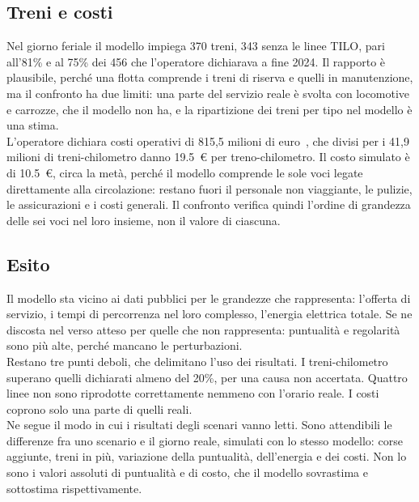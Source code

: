 \subsection{Treni e costi}
Nel giorno feriale il modello impiega 370 treni, 343 senza le linee TILO, pari all'81\% e al 75\% dei 456 che l'operatore dichiarava a fine 2024. Il rapporto è plausibile, perché una flotta comprende i treni di riserva e quelli in manutenzione, ma il confronto ha due limiti: una parte del servizio reale è svolta con locomotive e carrozze, che il modello non ha, e la ripartizione dei treni per tipo nel modello è una stima. \\
L'operatore dichiara costi operativi di 815,5 milioni di euro~\cite{trenord2026bilancio}, che divisi per i 41,9 milioni di treni-chilometro danno \SI{19,5}{\euro} per treno-chilometro. Il costo simulato è di \SI{10,5}{\euro}, circa la metà, perché il modello comprende le sole voci legate direttamente alla circolazione: restano fuori il personale non viaggiante, le pulizie, le assicurazioni e i costi generali. Il confronto verifica quindi l'ordine di grandezza delle sei voci nel loro insieme, non il valore di ciascuna.

\subsection{Esito}
Il modello sta vicino ai dati pubblici per le grandezze che rappresenta: l'offerta di servizio, i tempi di percorrenza nel loro complesso, l'energia elettrica totale. Se ne discosta nel verso atteso per quelle che non rappresenta: puntualità e regolarità sono più alte, perché mancano le perturbazioni. \\
Restano tre punti deboli, che delimitano l'uso dei risultati. I treni-chilometro superano quelli dichiarati almeno del 20\%, per una causa non accertata. Quattro linee non sono riprodotte correttamente nemmeno con l'orario reale. I costi coprono solo una parte di quelli reali. \\
Ne segue il modo in cui i risultati degli scenari vanno letti. Sono attendibili le differenze fra uno scenario e il giorno reale, simulati con lo stesso modello: corse aggiunte, treni in più, variazione della puntualità, dell'energia e dei costi. Non lo sono i valori assoluti di puntualità e di costo, che il modello sovrastima e sottostima rispettivamente.
